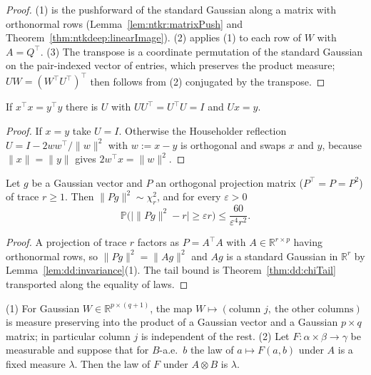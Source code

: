 \begin{proof}
  \leanok
(1) is the pushforward of the standard Gaussian along a matrix with orthonormal rows (Lemma~\ref{lem:ntkr:matrixPush} and Theorem~\ref{thm:ntkdeep:linearImage}).
(2) applies (1) to each row of $W$ with $A=Q^\top$. (3) The transpose is a coordinate permutation of the standard Gaussian on the pair-indexed vector of entries, which
preserves the product measure; $UW=(W^\top U^\top)^\top$ then follows from (2) conjugated by the transpose.
\end{proof}

\begin{lemma}\label{lem:dd:householder}
  \leanok
If $x^\top x=y^\top y$ there is $U$ with $UU^\top=U^\top U=I$ and $Ux=y$.
\end{lemma}

\begin{proof}
  \leanok
If $x=y$ take $U=I$. Otherwise the Householder reflection $U=I-2ww^\top/\|w\|^2$ with $w:=x-y$ is orthogonal and swaps $x$ and $y$, because
$\|x\|=\|y\|$ gives $2w^\top x=\|w\|^2$.
\end{proof}

\begin{lemma}\label{lem:dd:projectedChi}
  \leanok
Let $g$ be a Gaussian vector and $P$ an orthogonal projection matrix ($P^\top=P=P^2$) of trace $r\ge1$. Then $\|Pg\|^2\sim\chi^2_r$, and for every $\varepsilon>0$
\[
  \mathbb P\bigl(\bigl|\|Pg\|^2-r\bigr|\ge\varepsilon r\bigr)\le\frac{60}{\varepsilon^4r^2}.
\]
\end{lemma}

\begin{proof}
  \leanok
A projection of trace $r$ factors as $P=A^\top A$ with $A\in\mathbb R^{r\times p}$ having orthonormal rows, so $\|Pg\|^2=\|Ag\|^2$ and $Ag$ is a standard Gaussian
in $\mathbb R^r$ by Lemma~\ref{lem:dd:invariance}(1). The tail bound is Theorem~\ref{thm:dd:chiTail} transported along the equality of laws.
\end{proof}

\begin{lemma}\label{lem:dd:columnSplit}
  \leanok
(1) For Gaussian $W\in\mathbb R^{p\times(q+1)}$, the map $W\mapsto(\text{column }j,\ \text{the other columns})$ is measure preserving into the product of a Gaussian vector and a
Gaussian $p\times q$ matrix; in particular column $j$ is independent of the rest. (2) Let $F:\alpha\times\beta\to\gamma$ be measurable and suppose that for $B$-a.e.\ $b$ the law of
$a\mapsto F(a,b)$ under $A$ is a fixed measure $\lambda$. Then the law of $F$ under $A\otimes B$ is $\lambda$.
\end{lemma}

